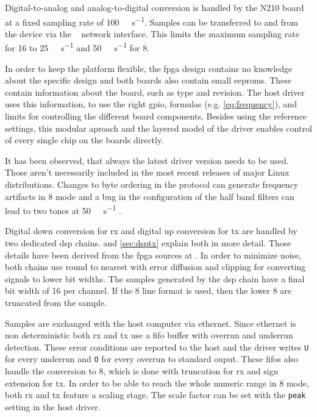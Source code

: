 \documentclass[12pt,a4paper,parskip=full,abstracton]{scrartcl}
\begin{document}
Digital-to-analog and analog-to-digital conversion is handled by the N210 board at a fixed sampling rate of
\SI{100}{\mega\samples\per\second}. Samples can be transferred to and from the device via the
\si{\giga\bit} network interface. This limits the maximum sampling rate for \SI{16}{\bit} to
\SI{25}{\mega\samples\per\second} and \SI{50}{\mega\samples\per\second} for \SI{8}{\bit}.

In order to keep the platform flexible, the \gls{fpga} design contains no knowledge
about the specific design and both boards also contain small \glspl{eeprom}. These contain
information about the board, such as type and revision. The host driver uses this information,
to use the right \gls{gpio}, formulas (e.g. \cref{eq:frequency}), and limits for controlling
the different board components. Besides using the reference settings, this modular aproach
and the layered model of the driver enables control of every single chip on the boards directly.

It has been observed, that always the latest driver version needs to be used. Those aren't
necessarily included in the most recent releases of major Linux distributions. Changes to
byte ordering in the protocol \cite{usrp_byte} can
generate frequency artifacts in \SI{8}{\bit} mode and a bug in the configuration of the half
band filters can lead to two tones at \SI{50}{\mega\samples\per\second} \cite{usrp_hb}.

Digital down conversion for \gls{rx} and digital up conversion for \gls{tx} are handled
by two dedicated \gls{dsp} chains.
 and \cref{sec:dsptx} explain both in more detail. Those details have been derived
from the \gls{fpga} sources at \cite{usrp_src}.
In order to minimize noise, both chains use round to nearest with error diffusion and clipping
for converting signals to lower bit widths. The samples generated by the dsp chain have a final
bit width of \SI{16}{\bit} per channel. If the \SI{8}{\bit} line format is used, then the
lower \SI{8}{\bit} are truncated from the sample.

Samples are exchanged with the host computer via ethernet. Since ethernet is non deterministic
both \gls{rx} and \gls{tx} use a \gls{fifo} buffer with overrun and underrun detection. These
error conditions are reported to the host and the driver writes \texttt{U} for every underrun
and \texttt{O} for every overrun to standard ouput. These \glspl{fifo} also handle the
conversion to \SI{8}{\bit}, which is done with truncation for \gls{rx} and sign extension for
\gls{tx}. In order to be able to reach the whole numeric range in \SI{8}{\bit} mode, both
\gls{rx} and \gls{tx} feature a scaling stage. The scale factor can be set with the
\texttt{peak} setting in the host driver.
\end{document}
